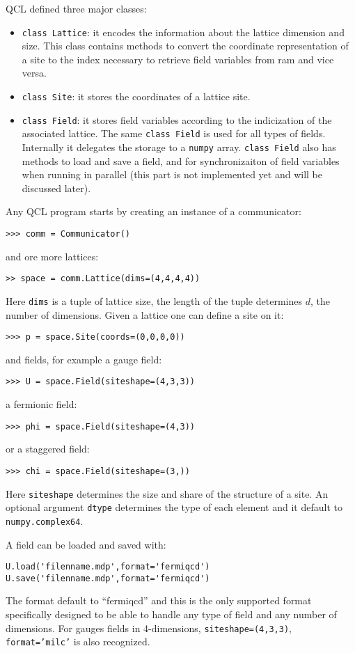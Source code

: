 \documentclass[12pt]{article}
\def\ft{\small\tt}
\begin{document}
QCL defined three major classes:
\begin{itemize}
\item {\ft class Lattice}: it encodes the information about the lattice dimension and size. This class contains methods to convert the coordinate representation of a site to the index necessary to retrieve field variables from ram and vice versa.
\item {\ft class Site}: it stores the coordinates of a lattice site.
\item {\ft class Field}: it stores field variables according to the indicization of the associated lattice. The same {\ft class Field} is used for all types of fields. Internally it delegates the storage to a {\ft numpy} array. {\ft class Field} also has methods to load and save a field, and for synchronizaiton of field variables when running in parallel (this part is not implemented yet and will be discussed later).
\end{itemize}

Any QCL program starts by creating an instance of a communicator:
\begin{lstlisting}
>>> comm = Communicator()
\end{lstlisting}
and ore more lattices:
\begin{lstlisting}
>> space = comm.Lattice(dims=(4,4,4,4))
\end{lstlisting}
Here {\ft dims} is a tuple of lattice size, the length of the tuple determines $d$, the number of dimensions.
Given a lattice one can define a site on it:
\begin{lstlisting}
>>> p = space.Site(coords=(0,0,0,0))
\end{lstlisting}
and fields, for example a gauge field:
\begin{lstlisting}
>>> U = space.Field(siteshape=(4,3,3))
\end{lstlisting}
a fermionic field:
\begin{lstlisting}
>>> phi = space.Field(siteshape=(4,3))
\end{lstlisting}
or a staggered field:
\begin{lstlisting}
>>> chi = space.Field(siteshape=(3,))
\end{lstlisting}
Here {\ft siteshape} determines the size and share of the structure of a site. An optional argument {\ft dtype} determines the type of each element and it default to {\ft numpy.complex64}.

A field can be loaded and saved with:
\begin{lstlisting}
U.load('filenname.mdp',format='fermiqcd')
U.save('filenname.mdp',format='fermiqcd')
\end{lstlisting}
The format default to ``fermiqcd'' and this is the only supported format specifically designed to be able to handle any type of field and any number of dimensions. For gauges fields in 4-dimensions, {\ft siteshape=(4,3,3)}, {\ft format='milc'} is also recognized.
\end{document}
